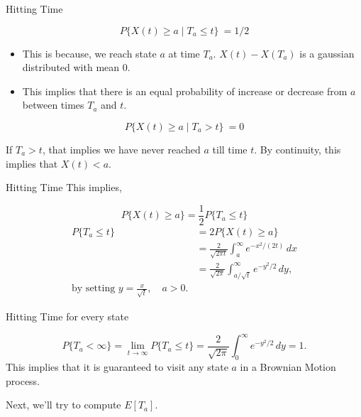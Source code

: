 \documentclass{beamer}
\begin{document}
	\begin{frame}{Hitting Time}
		\begin{center}
			\[
			P\{X(t)\ge a \mid T_a \le t\}\ = 1/2
			\]
			
		\end{center}
		
		\begin{itemize}
			\item This is because, we reach state $a$ at time $T_a$. $X(t)-X(T_a)$ is a gaussian distributed with mean 0.
			\item This implies that there is an equal probability of increase or decrease from $a$ between times $T_a$ and $t$.
		\end{itemize}
		
		\begin{center}
			\[
			P\{X(t)\ge a \mid T_a > t\}\ = 0
			\]
			
			If $T_a > t$, that implies we have never reached $a$ till time $t$. By continuity, this implies that $X(t)<a$. 
			
		\end{center}
		
		
	\end{frame}
	
	\begin{frame}{Hitting Time}
		This implies, 
		\begin{center}
			\[
			P\{X(t)\ge a\} = \frac{1}{2}P\{T_a \le t\}
			\]
			\[
			\begin{aligned}
				P\{T_a \le t\} &= 2P\{X(t)\ge a\} \\
				&= \frac{2}{\sqrt{2\pi t}} \int_a^\infty e^{-x^2/(2t)}\,dx \\
				&= \frac{2}{\sqrt{2\pi}} \int_{a/\sqrt{t}}^\infty e^{-y^2/2}\,dy,
				\\ \text{by setting } y=\frac{x}{\sqrt{t}}, \quad a>0.
			\end{aligned}
			\]
		\end{center}
	\end{frame}
	
	
	\begin{frame}{Hitting Time for every state}
		\begin{center}
			\[
			P\{T_a < \infty\}
			=
			\lim_{t\to\infty} P\{T_a \le t\}
			=
			\frac{2}{\sqrt{2\pi}} \int_0^\infty e^{-y^2/2}\,dy
			=
			1.
			\]
			This implies that it is guaranteed to visit any state $a$ in a Brownian Motion process.
		\end{center}
		
		Next, we'll try to compute $E[T_a]$.
	\end{frame}
	
\end{document}
